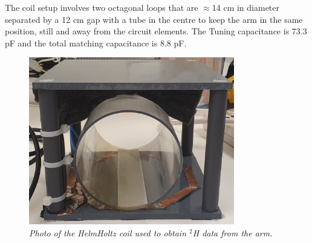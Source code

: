 The coil setup involves two octagonal loops that are $\approx$14 cm in diameter separated by a 12 cm gap with a tube in the centre to keep the arm in the same position, still and away from the circuit elements. The Tuning capacitance is 73.3 pF and the total matching capacitance is 8.8 pF.

\begin{figure}
    \centering
    \includegraphics[width=0.8\textwidth]{Figures/Theory/HelmHoltz_Coil.jpg}
    \caption{\textit{Photo of the HelmHoltz coil used to obtain $^2$H data from the arm.}}
    \label{fig:theory:HelmHoltz_pic}
\end{figure}